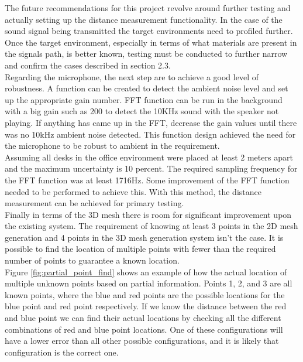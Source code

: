 The future recommendations for this project revolve around further testing and actually setting up the distance measurement functionality. In the case of the sound signal being transmitted the target environments need to profiled further. Once the target environment, especially in terms of what materials are present in the signals path, is better known, testing must be conducted to further narrow and confirm the cases described in section 2.3. \\

Regarding the microphone, the next step are to achieve a good level of robustness. A function can be created to detect the ambient noise level and set up the appropriate gain number. FFT function can be run in the background with a big gain such as 200 to detect the 10KHz sound with the speaker not playing. If anything has came up in the FFT, decrease the gain values until there was no 10kHz ambient noise detected. This function design achieved the need for the microphone to be robust to ambient in the requirement. \\

Assuming all desks in the office environment were placed at least 2 meters apart and the maximum uncertainty is 10 percent. The required sampling frequency for the FFT function was at least 1716Hz. Some improvement of the FFT function needed to be performed to achieve this. With this method, the distance measurement can be achieved for primary testing.\\

Finally in terms of the 3D mesh there is room for significant improvement upon the existing system. The requirement of knowing at least 3 points in the 2D mesh generation and 4 points in the 3D mesh generation system isn't the case. It is possible to find the location of multiple points with fewer than the required number of points to guarantee a known location.\\

Figure \ref{fig:partial_point_find} shows an example of how the actual location of multiple unknown points based on partial information. Points 1, 2, and 3 are all known points, where the blue and red points are the possible locations for the blue point and red point respectively. If we know the distance between the red and blue point we can find their actual locations by checking all the different combinations of red and blue point locations. One of these configurations will have a lower error than all other possible configurations, and it is likely that configuration is the correct one.\\

